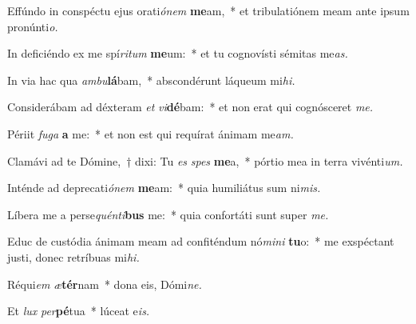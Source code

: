 \item Effúndo in conspéctu ejus orati\hspace*{0.03em}\textit{ónem} \textbf{me}am,~* et tribulatiónem meam ante ipsum pronúnti\hspace*{0.03em}\textit{o.}
\item In deficiéndo ex me spí\hspace*{0.03em}\textit{ritum} \textbf{me}um:~* et tu cognovísti sémitas me\hspace*{0.03em}\textit{as.}
\item In via hac qua \textit{ambu}\textbf{lá}bam,~* abscondérunt láqueum mi\textit{hi.}
\item Considerábam ad déxteram \textit{et} \textit{vi}\textbf{dé}bam:~* et non erat qui cognósceret \textit{me.}
\item Périit \textit{fuga} \textbf{a} me:~* et non est qui requírat ánimam me\textit{am.}
\item Clamávi ad te Dómine,~† dixi: Tu \textit{es} \textit{spes} \textbf{me}a,~* pórtio mea in terra vivénti\textit{um.}
\item Inténde ad deprecati\textit{ónem} \textbf{me}am:~* quia humiliátus sum ni\textit{mis.}
\item Líbera me a perse\textit{quénti}\textbf{bus} me:~* quia confortáti sunt super \textit{me.}
\item Educ de custódia ánimam meam ad confiténdum nó\textit{mini} \textbf{tu}o:~* me exspéctant justi, donec retríbuas mi\textit{hi.}
\item Réqui\hspace*{0.03em}\textit{em} \textit{æ}\textbf{tér}nam~* dona eis, Dómi\textit{ne.}
\item Et \textit{lux} \textit{per}\textbf{pé}tua~* lúceat e\hspace*{0.03em}\textit{is.}